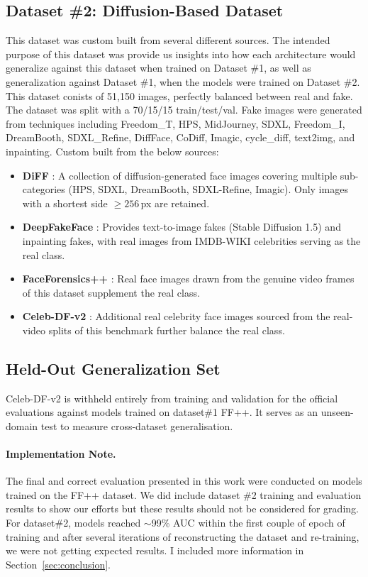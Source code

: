 \documentclass[conference]{IEEEtran}
\begin{document}
\subsection{Dataset \#2: Diffusion-Based Dataset}
This dataset was custom built from several different sources. The intended purpose of this dataset was provide us insights into how each architecture would generalize against this dataset when trained on Dataset \#1, as well as generalization against Dataset \#1, when the models were trained on Dataset \#2. This dataset conists of 51,150 images, perfectly balanced between real and fake. The dataset was split with a 70/15/15 train/test/val. Fake images were generated from techniques including Freedom\_T, HPS, MidJourney, SDXL, Freedom\_I, DreamBooth, SDXL\_Refine, DiffFace, CoDiff, Imagic, cycle\_diff, text2img, and inpainting.
Custom built from the below sources:
\begin{itemize}
  \item \textbf{DiFF} \cite{he2021diff}: A collection of
        diffusion-generated face images covering multiple
        sub-categories (HPS, SDXL, DreamBooth, SDXL-Refine, Imagic).
        Only images with a shortest side $\geq 256$\,px are retained.
  \item \textbf{DeepFakeFace} \cite{deepfakeface2023}: Provides
        text-to-image fakes (Stable Diffusion 1.5) and inpainting
        fakes, with real images from IMDB-WIKI celebrities serving as
        the real class.
  \item \textbf{FaceForensics++} \cite{rossler2019faceforensics}: Real
        face images drawn from the genuine video frames of this dataset
        supplement the real class.
  \item \textbf{Celeb-DF-v2} \cite{li2020celeb}: Additional real
        celebrity face images sourced from the real-video splits of
        this benchmark further balance the real class.
\end{itemize}

\subsection{Held-Out Generalization Set}
Celeb-DF-v2 \cite{li2020celeb} is withheld entirely from training and
validation for the official evaluations against models trained on dataset\#1 FF++.  It serves as an unseen-domain test to measure
cross-dataset generalisation.

\paragraph{Implementation Note.} The final and correct evaluation presented in this work were conducted on models trained on the FF++ dataset. We did include dataset \#2  training and evaluation results to show our efforts but these results should not be considered for grading. For dataset\#2, models reached $\sim$99\% AUC within the first couple of epoch of training and after several iterations of reconstructing the dataset and re-training, we were not getting expected results. I included more information in Section~\ref{sec:conclusion}.
\end{document}
